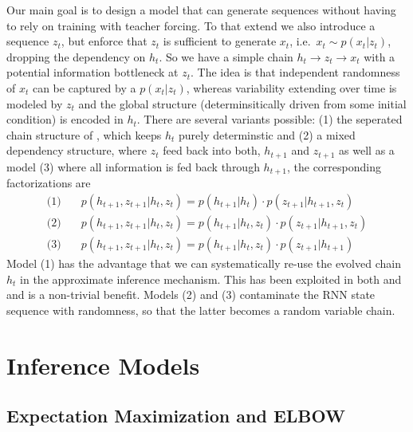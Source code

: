 \documentclass[a4paper,10pt]{article}
\begin{document}
Our main goal is to design a model that can generate sequences without having to rely on training with teacher forcing. To that extend we also introduce a sequence $z_t$, but enforce that $z_t$ is sufficient to generate $x_t$, i.e.~$x_t \sim p(x_t| z_t)$, dropping the dependency on $h_t$. So we have a simple chain $h_t \to z_t \to x_t$ with a potential information bottleneck at $z_t$. The idea is that independent randomness of $x_t$ can be captured by a $p(x_t | z_t)$, whereas variability extending over time is modeled by $z_t$ and the global structure (determinsitically driven from some initial condition) is encoded in $h_t$. There are several variants possible: (1) the seperated chain structure of \cite{fraccaro2016sequential}, which keeps $h_t$ purely determinstic and (2) a mixed dependency structure, where $z_t$ feed back into both, $h_{t+1}$ and $z_{t+1}$ as well as a model (3) where all information is fed back through $h_{t+1}$, the corresponding factorizations are 
\begin{align}
\text{(1)} \quad & p(h_{t+1}, z_{t+1} | h_t, z_t) = p(h_{t+1} | h_t) \cdot p(z_{t+1}| h_{t+1}, z_t) \\
\text{(2)} \quad & p(h_{t+1}, z_{t+1} | h_t, z_t) = p(h_{t+1} | h_t, z_t) \cdot p(z_{t+1}| h_{t+1}, z_t)\\
\text{(3)} \quad & p(h_{t+1}, z_{t+1} | h_t, z_t) = p(h_{t+1} | h_t, z_t) \cdot p(z_{t+1}| h_{t+1})
\end{align}
Model (1) has the advantage that we can systematically re-use the evolved chain $h_t$ in the approximate inference mechanism. This has been exploited in both  \cite{chung2015recurrent} and  \cite{fraccaro2016sequential} and is a non-trivial benefit. Models (2) and (3) contaminate the RNN state sequence with randomness, so that the latter becomes a random variable chain. 

\section{Inference Models}

\subsection{Expectation Maximization and ELBOW}



\end{document}

